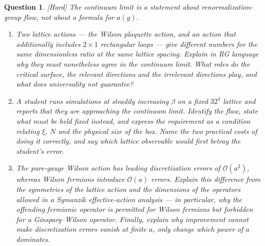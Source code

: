 \documentclass[11pt]{article}
\newcommand{\diff}[1]{\textcolor{blue!60!black}{\footnotesize\textsf{[#1]}}\quad}
\newtheorem{question}{Question}
\begin{document}
\begin{question}
\diff{Hard} The continuum limit is a statement about renormalization-group flow, not about a formula for $a(g)$.
\begin{enumerate}[label=(\roman*), leftmargin=*]
  \item Two lattice actions --- the Wilson plaquette action, and an action that additionally includes $2\times 1$ rectangular loops --- give \emph{different} numbers for the same dimensionless ratio at the same lattice spacing. Explain in RG language why they must nonetheless agree in the continuum limit. What roles do the critical surface, the relevant directions and the irrelevant directions play, and what does universality \emph{not} guarantee?
  \item A student runs simulations at steadily increasing $\beta$ on a fixed $32^4$ lattice and reports that they are approaching the continuum limit. Identify the flaw, state what must be held fixed instead, and express the requirement as a condition relating $\xi$, $N$ and the physical size of the box. Name the two practical costs of doing it correctly, and say which lattice observable would first betray the student's error.
  \item The pure-gauge Wilson action has leading discretization errors of $\mathcal{O}(a^2)$, whereas Wilson fermions introduce $\mathcal{O}(a)$ errors. Explain this difference from the symmetries of the lattice action and the dimensions of the operators allowed in a Symanzik effective-action analysis --- in particular, why the offending fermionic operator is permitted for Wilson fermions but forbidden for a Ginsparg--Wilson operator. Finally, explain why improvement cannot make discretization errors vanish at finite $a$, only change which power of $a$ dominates.
\end{enumerate}
\end{question}
\end{document}
